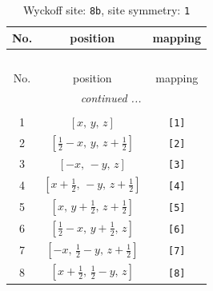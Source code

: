 \documentclass[fleqn,8pt]{jsarticle}
\begin{document}
\begin{longtable}{ccc}
\caption{Wyckoff site: {\tt 8b}, site symmetry: {\tt 1}}
 \\
 \hline \hline
No. & position & mapping \\ \hline \endfirsthead

\multicolumn{2}{l}{\tablename\ \thetable{}} \\
 \hline \hline
No. & position & mapping \\ \hline \endhead

 \hline \hline
\multicolumn{2}{r}{\footnotesize\it continued ...} \\ \endfoot

 \hline \hline
\multicolumn{2}{r}{} \\ \endlastfoot

1 & $\left[ x,\, y,\, z \right]$ & {\tt [1]} \\ \hline
2 & $\left[ \frac{1}{2} - x,\, y,\, z + \frac{1}{2} \right]$ & {\tt [2]} \\ \hline
3 & $\left[ - x,\, - y,\, z \right]$ & {\tt [3]} \\ \hline
4 & $\left[ x + \frac{1}{2},\, - y,\, z + \frac{1}{2} \right]$ & {\tt [4]} \\ \hline
5 & $\left[ x,\, y + \frac{1}{2},\, z + \frac{1}{2} \right]$ & {\tt [5]} \\ \hline
6 & $\left[ \frac{1}{2} - x,\, y + \frac{1}{2},\, z \right]$ & {\tt [6]} \\ \hline
7 & $\left[ - x,\, \frac{1}{2} - y,\, z + \frac{1}{2} \right]$ & {\tt [7]} \\ \hline
8 & $\left[ x + \frac{1}{2},\, \frac{1}{2} - y,\, z \right]$ & {\tt [8]} \\
\end{longtable}
\end{document}
